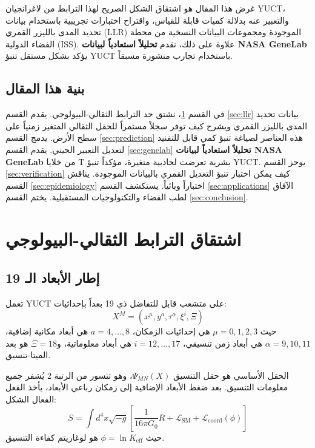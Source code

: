 \documentclass[11pt,a4paper]{article}
\newcommand{\Keff}{K_{\mathrm{eff}}}
\theoremstyle{remark}
\begin{document}
	غرض هذا المقال هو اشتقاق الشكل الصريح لهذا الترابط من لاغرانجيان YUCT، والتعبير عنه بدلالة كميات قابلة للقياس، واقتراح اختبارات تجريبية باستخدام بيانات تحديد المدى بالليزر القمري (LLR) الموجودة ومجموعات البيانات النسخية من محطة الفضاء الدولية (ISS). علاوة على ذلك، نقدم \textbf{تحليلاً استعادياً لبيانات NASA GeneLab} يؤكد بشكل مستقل تنبؤ YUCT باستخدام تجارب منشورة مسبقاً.
	
	\subsection{بنية هذا المقال}
	
	في القسم \ref{sec:derivation}، نشتق حد الترابط الثقالي-البيولوجي. يقدم القسم \ref{sec:llr} بيانات تحديد المدى بالليزر القمري ويشرح كيف توفر سجلاً مستمراً للحقل الثقالي المتغير زمنياً على سطح الأرض. يدمج القسم \ref{sec:prediction} هذه العناصر لصياغة تنبؤ كمي قابل للتفنيد لتعديل التعبير الجيني. يقدم القسم \ref{sec:genelab} \textbf{تحليلاً استعادياً لبيانات NASA GeneLab} من خلايا T بشرية تعرضت لجاذبية متغيرة، مؤكداً تنبؤ YUCT. يوجز القسم \ref{sec:verification} كيف يمكن اختبار تنبؤ التعديل القمري بالبيانات الموجودة. يناقش القسم \ref{sec:epidemiology} اختباراً وبائياً. يستكشف القسم \ref{sec:applications} الآفاق لطب الفضاء والتكنولوجيات المستقبلية. يختم القسم \ref{sec:conclusion}.
	
	\section{اشتقاق الترابط الثقالي-البيولوجي}
	\label{sec:derivation}
	
	\subsection{إطار الأبعاد الـ 19}
	
	تعمل YUCT على متشعب قابل للتفاضل ذي 19 بعداً بإحداثيات:
	\[
	X^M = (x^\mu, y^a, \tau^\alpha, \xi^i, \Xi)
	\]
	حيث \(\mu = 0,1,2,3\) هي إحداثيات الزمكان، \(a = 4,\dots,8\) هي أبعاد مكانية إضافية، \(\alpha = 9,10,11\) هي أبعاد زمن تنسيقي، \(i = 12,\dots,17\) هي أبعاد معلوماتية، و\(\Xi = 18\) هو بعد الميتا-تنسيق.
	
	الحقل الأساسي هو حقل التنسيق \(\Psi_{MN}(X)\)، وهو تنسور من الرتبة 2 يُشفر جميع معلومات التنسيق. بعد ضغط الأبعاد الإضافية إلى زمكان رباعي الأبعاد، يأخذ الفعل الفعال الشكل:
	\begin{equation}
		S = \int d^4x \sqrt{-g} \left[ \frac{1}{16\pi G_0} R + \mathcal{L}_{\text{SM}} + \mathcal{L}_{\text{coord}}(\phi) \right]
		\label{eq:action}
	\end{equation}
	حيث \(\phi = \ln \Keff\) هو لوغاريتم كفاءة التنسيق.
	
\end{document}
